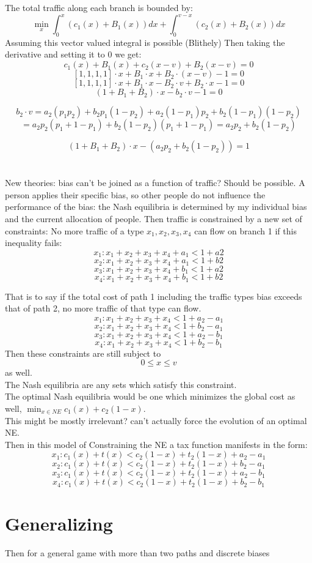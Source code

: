 \documentclass[12pt]{article}
\begin{document}
The total traffic along each branch is bounded by:
\[\min_x \int_0^x (c_1(x) +B_1(x))dx +  \int_0^{v-x}(c_2(x) +B_2(x))dx\]
Assuming this vector valued integral is possible (Blithely) Then taking the derivative and setting it to 0 we get:
\[ c_1(x) +B_1(x) + c_2(x-v) +B_2(x-v) = 0 \]
\[  [1,1,1,1] \cdot x + B_1 \cdot x  +B_2\cdot (x-v) -1 =0\]
\[  [1,1,1,1] \cdot x + B_1 \cdot x  -B_2\cdot v +B_2 \cdot x -1 =0\]
\[  (1+ B_1 +B_2) \cdot x - b_2\cdot v -1 =0\]

\[b_2 \cdot v = a_2(p_1p_2)+ b_2p_1(1-p_2)+a_2(1-p_1)p_2 + b_2(1-p_1)(1-p_2) \]\[= a_2p_2(p_1+1-p_1) +b_2(1-p_2)(p_1+1-p_1) = a_2p_2 +b_2(1-p_2)\]

\[  (1+ B_1 +B_2) \cdot x -( a_2p_2 +b_2(1-p_2)) = 1\]
\section{}
New theories: bias can't be joined as a function of traffic? Should be possible. A person applies their specific bias, so other people do not influence the performance of the bias: the Nash equilibria is determined by my individual bias  and the current allocation of people. Then traffic is constrained by a new set of constraints:
No more traffic of a type $x_1,x_2,x_3,x_4$ can flow on branch 1 if this inequality fails:
 \[x_1: x_1+x_2+x_3+x_4 + a_1  < 1+a2 \]
 \[x_2:x_1+x_2+x_3+x_4+ a_1  < 1+b2 \]
 \[x_3: x_1+x_2+x_3+x_4 + b_1  < 1+a2 \]
 \[x_4: x_1+x_2+x_3+x_4 + b_1  < 1+b2 \]
 
That is to say if the total cost of path 1 including the traffic types bias exceeds that of path 2, no more traffic of that type can flow.\\
 \[x_1: x_1+x_2+x_3+x_4   < 1+a_2 -a_1 \]
 \[x_2:x_1+x_2+x_3+x_4  < 1+b_2 -a_1 \]
 \[x_3: x_1+x_2+x_3+x_4  < 1+a_2-b_1 \]
 \[x_4: x_1+x_2+x_3+x_4  < 1+b_2 -b_1 \]
Then these constraints are still subject to \[0 \leq x \leq v\] as well.\\
 The Nash equilibria are any sets which satisfy this constraint.\\
 The optimal Nash equilibria would be one which minimizes the global cost as well, $\min_{x\in NE} c_1(x) + c_2(1-x)$.\\ This might be mostly irrelevant? can't actually force the evolution of an optimal NE.\\
 Then in this model of Constraining the NE a tax function manifests in the form:
 \[x_1: c_1(x) +t(x)   < c_2(1-x)+t_2(1-x)+a_2 -a_1 \]
 \[x_2:c_1(x)+t(x) < c_2(1-x)+t_2(1-x)+b_2 -a_1 \]
 \[x_3: c_1(x)+t(x)  < c_2(1-x)+t_2(1-x)+a_2-b_1 \]
 \[x_4: c_1(x)+t(x)  < c_2(1-x)+t_2(1-x)+b_2 -b_1 \]
 
 \section{Generalizing}
 Then for a general game with more than two paths and discrete biases 
\end{document}
